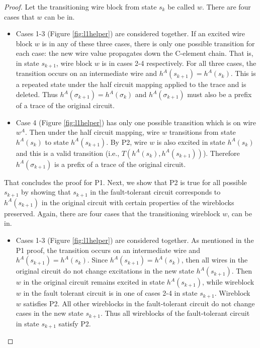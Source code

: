 \documentclass[12pt]{report}
\begin{document}
\begin{proof}
Let the transitioning wire block from state $s_k$ be called $w$.  There are four cases that $w$ can be in.  %
\begin{itemize}  
\item Cases 1-3 (Figure \ref{fig:l1helper}) are considered together.  
If an excited wire block $w$ is in any of these three cases, there is only one possible transition for each case: the new wire value propagates down the C-element chain.  That is, in state $s_{k+1}$, wire block $w$ is in cases 2-4 respectively.  For all three cases, the transition occurs on an intermediate wire and $h^A(s_{k+1})=h^A(s_{k})$.  This is a repeated state under the half circuit mapping applied to the trace and is deleted.  Thus $h^{A}(\sigma_{k+1})=h^{A}(\sigma_k)$ and $h^{A}(\sigma_{k+1})$ must also be a prefix of a trace of the original circuit. 
\item Case 4 (Figure \ref{fig:l1helper}) has only one possible transition which is on wire $w^A$.  Then under the half circuit mapping, wire $w$ transitions from state $h^A(s_k)$ to state $h^A(s_{k+1})$.  By P2, wire $w$ is also excited in state $h^A(s_k)$ and this is a valid transition (i.e., $T(h^A(s_k), h^A(s_{k+1}))$).  Therefore $h^{A}(\sigma_{k+1})$ is a prefix of a trace of the original circuit. 
\end{itemize}

That concludes the proof for P1.  Next, we show that P2 is true for all possible $s_{k+1}$ by showing that $s_{k+1}$ in the fault-tolerant circuit corresponds to $h^A(s_{k+1})$ in the original circuit with certain properties of the wireblocks preserved.  Again, there are four cases that the transitioning wireblock $w$, can be in.  

\begin{itemize}
\item Cases 1-3 (Figure \ref{fig:l1helper}) are considered together.  As mentioned in the P1 proof, the transition occurs on an intermediate wire and $h^A(s_{k+1})=h^A(s_{k})$.  Since $h^A(s_{k+1})=h^A(s_{k})$, then all wires in the original circuit do not change excitations in the new state $h^A(s_{k+1})$.  Then $w$ in the original circuit remains excited in state $h^A(s_{k+1})$, while wireblock $w$ in the fault tolerant circuit is in one of cases 2-4 in state $s_{k+1}$.  Wireblock $w$ satisfies P2.  All other wireblocks in the fault-tolerant circuit do not change cases in the new state $s_{k+1}$.  
Thus all wireblocks of the fault-tolerant circuit in state $s_{k+1}$ satisfy P2.     


\end{itemize}
\end{proof}
\end{document}
